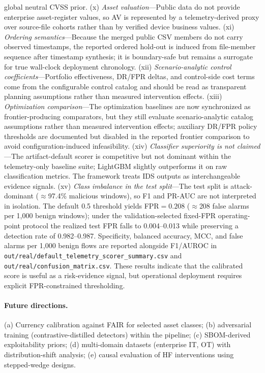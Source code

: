 \documentclass[preprint,12pt]{elsarticle}
\def\textsubscript#1{#1}%
\begin{document}
global neutral CVSS prior. (x) \emph{Asset valuation}---Public data do not provide enterprise asset-register values, so AV is represented by a telemetry-derived proxy over source-file cohorts rather than by verified device business values. (xi) \emph{Ordering semantics}---Because the merged public CSV members do not carry observed timestamps, the reported ordered hold-out is induced from file-member sequence after timestamp synthesis; it is boundary-safe but remains a surrogate for true wall-clock deployment chronology. (xii) \emph{Scenario-analytic control coefficients}---Portfolio effectiveness, DR/FPR deltas, and control-side cost terms come from the configurable control catalog and should be read as transparent planning assumptions rather than measured intervention effects. (xiii) \emph{Optimization comparison}---The optimization baselines are now synchronized as frontier-producing comparators, but they still evaluate scenario-analytic catalog assumptions rather than measured intervention effects; auxiliary DR/FPR policy thresholds are documented but disabled in the reported frontier comparison to avoid configuration-induced infeasibility. (xiv) \emph{Classifier superiority is not claimed}---The artifact-default scorer is competitive but not dominant within the telemetry-only baseline suite; LightGBM slightly outperforms it on raw classification metrics. The framework treats IDS outputs as interchangeable evidence signals. (xv) \emph{Class imbalance in the test split}---The test split is attack-dominant ($\approx$97.4\% malicious windows), so F\textsubscript{1} and PR-AUC are not interpreted in isolation. The default 0.5 threshold yields FPR$=0.208$ ($\approx$208 false alarms per 1,000 benign windows); under the validation-selected fixed-FPR operating-point protocol the realized test FPR falls to 0.004--0.013 while preserving a detection rate of 0.982--0.987. Specificity, balanced accuracy, MCC, and false alarms per 1,000 benign flows are reported alongside F\textsubscript{1}/AUROC in \texttt{out/real/default\_telemetry\_scorer\_summary.csv} and \texttt{out/real/confusion\_matrix.csv}. These results indicate that the calibrated score is useful as a risk-evidence signal, but operational deployment requires explicit FPR-constrained thresholding.

\paragraph{Future directions.} (a) Currency calibration against FAIR for selected asset classes; (b) adversarial training (contrastive-distilled detectors) within the pipeline; (c) SBOM-derived exploitability priors; (d) multi-domain datasets (enterprise IT, OT) with distribution-shift analysis; (e) causal evaluation of HF interventions using stepped-wedge designs.
\end{document}
